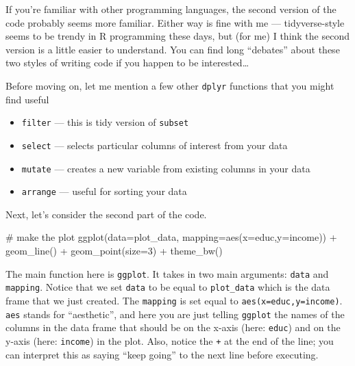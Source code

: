 \documentclass[
  letterpaper,
  DIV=11,
  numbers=noendperiod]{scrreprt}
\newenvironment{Shaded}{\begin{snugshade}}{\end{snugshade}}
\newcommand{\AttributeTok}[1]{\textcolor[rgb]{0.40,0.45,0.13}{#1}}
\newcommand{\CommentTok}[1]{\textcolor[rgb]{0.37,0.37,0.37}{#1}}
\newcommand{\DecValTok}[1]{\textcolor[rgb]{0.68,0.00,0.00}{#1}}
\newcommand{\FunctionTok}[1]{\textcolor[rgb]{0.28,0.35,0.67}{#1}}
\newcommand{\NormalTok}[1]{\textcolor[rgb]{0.00,0.23,0.31}{#1}}
\newcommand{\SpecialCharTok}[1]{\textcolor[rgb]{0.37,0.37,0.37}{#1}}
\begin{document}
If you're familiar with other programming languages, the second version
of the code probably seems more familiar. Either way is fine with me ---
tidyverse-style seems to be trendy in R programming these days, but (for
me) I think the second version is a little easier to understand. You can
find long ``debates'' about these two styles of writing code if you
happen to be interested\ldots{}

Before moving on, let me mention a few other \texttt{dplyr} functions
that you might find useful

\begin{itemize}
\item
  \texttt{filter} --- this is tidy version of \texttt{subset}
\item
  \texttt{select} --- selects particular columns of interest from your
  data
\item
  \texttt{mutate} --- creates a new variable from existing columns in
  your data
\item
  \texttt{arrange} --- useful for sorting your data
\end{itemize}

Next, let's consider the second part of the code.

\begin{Shaded}
\begin{Highlighting}[]
\CommentTok{\# make the plot}
\FunctionTok{ggplot}\NormalTok{(}\AttributeTok{data=}\NormalTok{plot\_data,}
       \AttributeTok{mapping=}\FunctionTok{aes}\NormalTok{(}\AttributeTok{x=}\NormalTok{educ,}\AttributeTok{y=}\NormalTok{income)) }\SpecialCharTok{+}
    \FunctionTok{geom\_line}\NormalTok{() }\SpecialCharTok{+} 
    \FunctionTok{geom\_point}\NormalTok{(}\AttributeTok{size=}\DecValTok{3}\NormalTok{) }\SpecialCharTok{+} 
    \FunctionTok{theme\_bw}\NormalTok{()}
\end{Highlighting}
\end{Shaded}

The main function here is \texttt{ggplot}. It takes in two main
arguments: \texttt{data} and \texttt{mapping}. Notice that we set
\texttt{data} to be equal to \texttt{plot\_data} which is the data frame
that we just created. The \texttt{mapping} is set equal to
\texttt{aes(x=educ,y=income)}. \texttt{aes} stands for ``aesthetic'',
and here you are just telling \texttt{ggplot} the names of the columns
in the data frame that should be on the x-axis (here: \texttt{educ}) and
on the y-axis (here: \texttt{income}) in the plot. Also, notice the
\texttt{+} at the end of the line; you can interpret this as saying
``keep going'' to the next line before executing.
\end{document}
